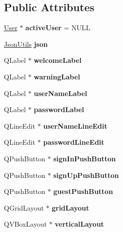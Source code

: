 \subsection*{Public Attributes}
\begin{DoxyCompactItemize}
\item 
\mbox{\label{classLandingPage_ade505382a248c9dd438bebd05e4d97e2}} 
\hyperlink{classUser}{User} $\ast$ {\bfseries active\+User} = N\+U\+LL
\item 
\mbox{\label{classLandingPage_af4e3bbbffaeac819e155b9469b8e7637}} 
\hyperlink{classJsonUtils}{Json\+Utils} {\bfseries json}
\item 
\mbox{\label{classLandingPage_a50c6ddfcb0b255fee3dd56fa4c9b824c}} 
Q\+Label $\ast$ {\bfseries welcome\+Label}
\item 
\mbox{\label{classLandingPage_acc3f6b67a349288c237fffad6320019b}} 
Q\+Label $\ast$ {\bfseries warning\+Label}
\item 
\mbox{\label{classLandingPage_a40f3f068076aa792c022313c771efbba}} 
Q\+Label $\ast$ {\bfseries user\+Name\+Label}
\item 
\mbox{\label{classLandingPage_a745d6e547f5cded8fdf85f4ffebcf692}} 
Q\+Label $\ast$ {\bfseries password\+Label}
\item 
\mbox{\label{classLandingPage_a12d650b1cda07a18943ed301e2458eca}} 
Q\+Line\+Edit $\ast$ {\bfseries user\+Name\+Line\+Edit}
\item 
\mbox{\label{classLandingPage_a8dcc6ee45a2e96aef191531562100aeb}} 
Q\+Line\+Edit $\ast$ {\bfseries password\+Line\+Edit}
\item 
\mbox{\label{classLandingPage_a79b9d94337a25c1c66245853586f0e49}} 
Q\+Push\+Button $\ast$ {\bfseries sign\+In\+Push\+Button}
\item 
\mbox{\label{classLandingPage_a770ca5552d0e19f3c88d889a9946fcd1}} 
Q\+Push\+Button $\ast$ {\bfseries sign\+Up\+Push\+Button}
\item 
\mbox{\label{classLandingPage_ac006ddb5fbb6c397abdc6da03a6ff7c6}} 
Q\+Push\+Button $\ast$ {\bfseries guest\+Push\+Button}
\item 
\mbox{\label{classLandingPage_a75f2ed3f180997a8b8278b73af220f8a}} 
Q\+Grid\+Layout $\ast$ {\bfseries grid\+Layout}
\item 
\mbox{\label{classLandingPage_ad74571484af5f7eda5612036f59fc4c9}} 
Q\+V\+Box\+Layout $\ast$ {\bfseries vertical\+Layout}
\end{DoxyCompactItemize}



